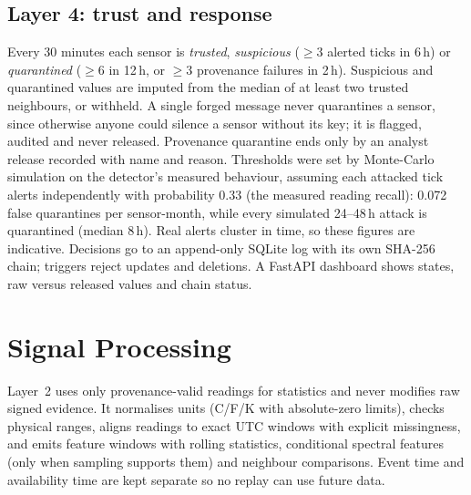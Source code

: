 \documentclass[conference]{IEEEtran}
\begin{document}
\subsection{Layer 4: trust and response}
Every 30 minutes each sensor is \emph{trusted}, \emph{suspicious} ($\geq 3$ alerted ticks in 6\,h) or
\emph{quarantined} ($\geq 6$ in 12\,h, or $\geq 3$ provenance failures in 2\,h). Suspicious and quarantined
values are imputed from the median of at least two trusted neighbours, or withheld. A single forged message
never quarantines a sensor, since otherwise anyone could silence a sensor without its key; it is flagged,
audited and never released. Provenance quarantine ends only by an analyst release recorded with name and
reason. Thresholds were set by Monte-Carlo simulation on the detector's measured behaviour, assuming each attacked
tick alerts independently with probability 0.33 (the measured reading recall): 0.072 false quarantines per
sensor-month, while every simulated 24--48\,h attack is quarantined (median 8\,h). Real alerts cluster in
time, so these figures are indicative. Decisions
go to an append-only SQLite log with its own SHA-256 chain; triggers reject updates and deletions. A
FastAPI dashboard shows states, raw versus released values and chain status.

\section{Signal Processing}

Layer~2 uses only provenance-valid readings for statistics and never modifies raw signed evidence. It
normalises units (\textdegree C/\textdegree F/K with absolute-zero limits), checks physical ranges, aligns
readings to exact UTC windows with explicit missingness, and emits feature windows with rolling statistics,
conditional spectral features (only when sampling supports them) and neighbour comparisons. Event time and
availability time are kept separate so no replay can use future data.
\end{document}
